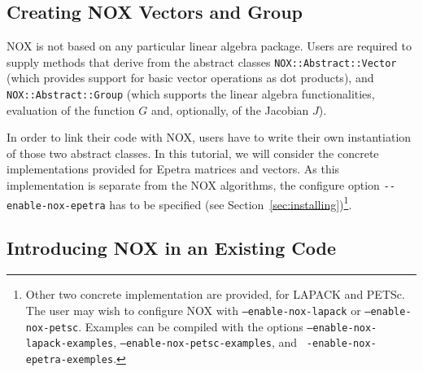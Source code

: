
\subsection{Creating NOX Vectors and Group}
\label{sec:nox_intro}

NOX is not based on any particular linear algebra package. Users are
required to supply methods that derive from the abstract classes
\verb!NOX::Abstract::Vector! (which provides support for basic vector
operations as dot products), and \verb!NOX::Abstract::Group!  (which
supports the linear algebra functionalities, evaluation of the function
$G$ and, optionally, of the Jacobian $J$).

In order to link their code with NOX, users have to write their own
instantiation of those two abstract classes. In this tutorial, we will
consider the concrete implementations provided for Epetra matrices and
vectors. As this implementation is separate from the NOX algorithms, the
configure option \verb!--enable-nox-epetra! has to be specified (see
Section~\ref{sec:installing})\footnote{Other two concrete implementation
  are provided, for LAPACK and PETSc. The user may wish to configure NOX
  with {\tt --enable-nox-lapack} or {\tt --enable-nox-petsc}. Examples
  can be compiled with the options {\tt --enable-nox-lapack-examples},
  {\tt --enable-nox-petsc-examples}, and {\tt
    -enable-nox-epetra-exemples}.}.


\subsection{Introducing NOX in an Existing Code}
\label{sec:nox_introduce}

